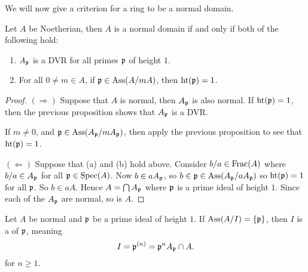 \documentclass{ximera}
\begin{document}
We will now give a criterion for a ring to be a normal domain.

\begin{theorem}
  Let $A$ be Noetherian, then $A$ is a normal domain if and only if
  both of the following hold:
  \begin{enumerate}
  \item $A_{\mathfrak{p}}$ is a DVR for all primes $\mathfrak{p}$ of height $1$.
  \item For all $0 \neq m \in A$, if $\mathfrak{p} \in \operatorname{Ass}(A/mA)$, then $\operatorname{ht}(\mathfrak{p}) = 1$.
  \end{enumerate}
  \begin{proof}
    $(\Rightarrow)$ Suppose that $A$ is normal, then $A_{\mathfrak{p}}$ is also
    normal. If $\operatorname{ht}(\mathfrak{p}) = 1$, then the previous proposition shows that
    $A_{\mathfrak{p}}$ is a DVR.

    If $m\ne 0$, and $\mathfrak{p} \in \operatorname{Ass}(A_{\mathfrak{p}}/mA_{\mathfrak{p}})$, then apply the previous
    proposition to see that $\operatorname{ht}(\mathfrak{p}) = 1$.

    $(\Leftarrow)$ Suppose that (a) and (b) hold above. Consider
    $b/a\in\operatorname{Frac}(A)$ where $b/a\in A_{\mathfrak{p}}$ for all $\mathfrak{p}\in\operatorname{Spec}(A)$. Now
    $b\in a A_{\mathfrak{p}}$, so $b\in \mathfrak{p}\in \operatorname{Ass}(A_{\mathfrak{p}}/aA_{\mathfrak{p}})$ so $\operatorname{ht}(\mathfrak{p}) = 1$
    for all $\mathfrak{p}$.  So $b\in a A$. Hence $A = \bigcap A_{\mathfrak{p}}$ where $\mathfrak{p}$
    is a prime ideal of height $1$. Since each of the $A_{\mathfrak{p}}$ are
    normal, so is $A$.
  \end{proof}
\end{theorem}


\begin{corollary}
  Let $A$ be normal and $\mathfrak{p}$ be a prime ideal of height $1$. If
  $\operatorname{Ass}(A/I) = \{\mathfrak{p}\}$, then $I$ is a  of $\mathfrak{p}$,
  meaning
  \[
  I = \mathfrak{p}^{(n)} = \mathfrak{p}^n A_{\mathfrak{p}} \cap A.
  \]
  for  $n\ge 1$.
\end{corollary}







\end{document}
